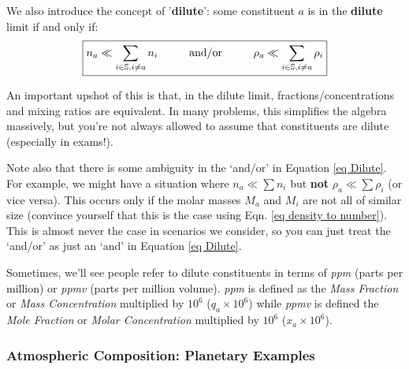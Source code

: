 We also introduce the concept of '\textbf{dilute}': some constituent \(a\) is in the \textbf{dilute} limit if and only if:
\begin{align}\label{eq Dilute}
    \boxed{n_a\ll\sum\limits_{i\in\mathbb{S},i\neq a} n_i\hspace{10mm}\text{and/or}\hspace{10mm}
    \rho_a\ll\sum\limits_{i\in\mathbb{S},i\neq a} \rho_i}
\end{align}

An important upshot of this is that, in the dilute limit, fractions/concentrations and mixing ratios are equivalent. In many problems, this simplifies the algebra massively, but you're not always allowed to assume that constituents are dilute (especially in exams!).

Note also that there is some ambiguity in the `and/or' in Equation \ref{eq Dilute}. For example, we might have a situation where \(n_a\ll\sum n_i\) but \textbf{not} \(\rho_a\ll\sum \rho_i\) (or vice versa). This occurs only if the molar masses \(M_a\) and \(M_i\) are not all of similar size (convince yourself that this is the case using Eqn. \ref{eq density to number}). This is almost never the case in scenarios we consider, so you can just treat the `and/or' as just an `and' in Equation \ref{eq Dilute}.

Sometimes, we'll see people refer to dilute constituents in terms of \textit{ppm} (parts per million) or \textit{ppmv} (parts per million volume). \textit{ppm} is defined as the \textit{Mass Fraction} or \textit{Mass Concentration} multiplied by \(10^{6}\) (\(q_a\times10^6\)) while \textit{ppmv} is defined the \textit{Mole Fraction} or \textit{Molar Concentration} multiplied by \(10^{6}\) (\(x_a\times10^6\)).

\subsubsection{Atmospheric Composition: Planetary Examples}

